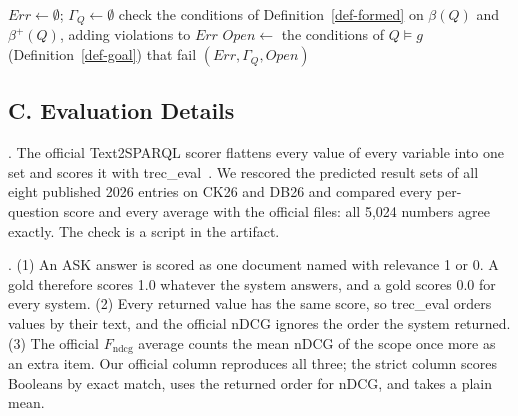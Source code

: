 \begin{algorithm}[t]
\caption{\textsc{Verify}$(Q, g)$}
\label{alg-verify}
$\mathit{Err} \leftarrow \emptyset$; $\Gamma_Q \leftarrow \emptyset$\;
check the conditions of Definition~\ref{def-formed} on $\beta(Q)$ and $\beta^+(Q)$, adding violations to $\mathit{Err}$\;
$\mathit{Open} \leftarrow$ the conditions of $Q \models g$ (Definition~\ref{def-goal}) that fail\;
\Return $(\mathit{Err}, \Gamma_Q, \mathit{Open})$\;
\end{algorithm}


\subsection*{C. Evaluation Details}

.
The official Text2SPARQL scorer flattens every value of every variable
into one set and scores it with trec\_eval~\cite{treceval}.
We rescored the predicted result sets of all eight published 2026
entries on CK26 and DB26 and compared every per-question score and
every average with the official files: all 5,024 numbers agree exactly.
The check is a script in the artifact.

.
(1) An ASK answer is scored as one document named  with
relevance 1 or 0. A gold  therefore scores 1.0 whatever the
system answers, and a gold  scores 0.0 for every system.
(2) Every returned value has the same score, so trec\_eval orders
values by their text, and the official nDCG ignores the order the
system returned.
(3) The official $F_{\mathrm{ndcg}}$ average counts the mean nDCG of
the scope once more as an extra item.
Our official column reproduces all three; the strict column scores
Booleans by exact match, uses the returned order for nDCG, and takes a
plain mean.

